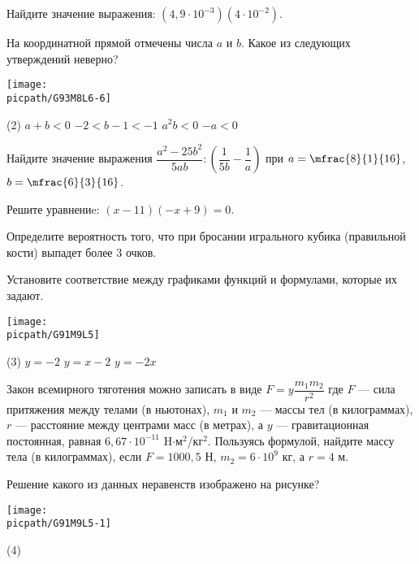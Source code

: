 \begin{class}[number=7]
	\begin{listofex}
		\item Найдите значение выражения: \((4,9\cdot10^{-3})(4\cdot10^{-2})\).
		\item На координатной прямой отмечены числа \( a \) и \( b \). Какое из следующих утверждений неверно?
		\begin{center}
			\texttt{[image: \\picpath/G93M8L6-6]}
		\end{center}
		\begin{tasks}(2)
			\task \( a+b<0 \)
			\task \( -2<b-1<-1 \)
			\task \( a^2b<0 \)
			\task \( -a<0 \)
		\end{tasks}
		\item Найдите значение выражения \( \dfrac{a^2-25b^2}{5ab}:\left( \dfrac{1}{5b}-\dfrac{1}{a} \right) \) при \( a=\mfrac{8}{1}{16} \), \( b=\mfrac{6}{3}{16} \).
		\item Решите уравнениe: \((x-11)(-x+9)=0\).
		\item Определите вероятность того, что при бросании игрального кубика (правильной кости) выпадет более \( 3 \) очков.
		\item Установите соответствие между графиками функций и формулами, которые их задают.
		\begin{center}
			\texttt{[image: \\picpath/G91M9L5]}
		\end{center}
		\begin{tasks}(3)
			\task \( y=-2 \)
			\task \( y=x-2 \)
			\task \( y=-2x \)
		\end{tasks}
		\item Закон всемирного тяготения можно записать в виде \( F=y\dfrac{m_1m_2}{r^2} \) где \( F \) --- сила притяжения между телами (в ньютонах), \( m_1 \) и \( m_2 \) --- массы тел (в килограммах), \( r \) --- расстояние между центрами масс (в метрах), а \( y \) --- гравитационная постоянная, равная \( 6,67\cdot10^{-11} \) H\( \cdot \)м\( ^2 \)/кг\( ^2 \). Пользуясь формулой, найдите массу тела (в килограммах), если \( F=1000,5 \) Н, \( m_2=6\cdot10^9 \) кг, а \( r=4 \) м.
		\item Решение какого из данных неравенств изображено на рисунке?
		\begin{center}
			\texttt{[image: \\picpath/G91M9L5-1]}
		\end{center}
		\begin{tasks}(4)

\end{tasks}
\end{listofex}
\end{class}
